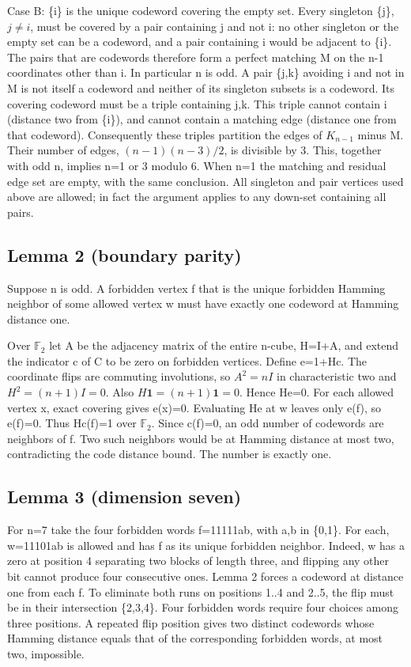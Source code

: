 \documentclass[
]{article}
\begin{document}
Case B: \{i\} is the unique codeword covering the empty set. Every
singleton \{j\}, \(j\ne i\), must be covered by a pair containing j and
not i: no other singleton or the empty set can be a codeword, and a pair
containing i would be adjacent to \{i\}. The pairs that are codewords
therefore form a perfect matching M on the n-1 coordinates other than i.
In particular n is odd. A pair \{j,k\} avoiding i and not in M is not
itself a codeword and neither of its singleton subsets is a codeword.
Its covering codeword must be a triple containing j,k. This triple
cannot contain i (distance two from \{i\}), and cannot contain a
matching edge (distance one from that codeword). Consequently these
triples partition the edges of \(K_{n-1}\) minus M. Their number of
edges, \((n-1)(n-3)/2\), is divisible by 3. This, together with odd n,
implies n=1 or 3 modulo 6. When n=1 the matching and residual edge set
are empty, with the same conclusion. All singleton and pair vertices
used above are allowed; in fact the argument applies to any down-set
containing all pairs.

\subsection{Lemma 2 (boundary parity)}\label{lemma-2-boundary-parity}

Suppose n is odd. A forbidden vertex f that is the unique forbidden
Hamming neighbor of some allowed vertex w must have exactly one codeword
at Hamming distance one.

Over \(\mathbb{F}_2\) let A be the adjacency matrix of the entire
n-cube, H=I+A, and extend the indicator c of C to be zero on forbidden
vertices. Define e=1+Hc. The coordinate flips are commuting involutions,
so \(A^2=nI\) in characteristic two and \(H^2=(n+1)I=0\). Also
\(H\mathbf{1}=(n+1)\mathbf{1}=0\). Hence He=0. For each allowed vertex
x, exact covering gives e(x)=0. Evaluating He at w leaves only e(f), so
e(f)=0. Thus Hc(f)=1 over \(\mathbb{F}_2\). Since c(f)=0, an odd number
of codewords are neighbors of f. Two such neighbors would be at Hamming
distance at most two, contradicting the code distance bound. The number
is exactly one.

\subsection{Lemma 3 (dimension seven)}\label{lemma-3-dimension-seven}

For n=7 take the four forbidden words f=11111ab, with a,b in \{0,1\}.
For each, w=11101ab is allowed and has f as its unique forbidden
neighbor. Indeed, w has a zero at position 4 separating two blocks of
length three, and flipping any other bit cannot produce four consecutive
ones. Lemma 2 forces a codeword at distance one from each f. To
eliminate both runs on positions 1..4 and 2..5, the flip must be in
their intersection \{2,3,4\}. Four forbidden words require four choices
among three positions. A repeated flip position gives two distinct
codewords whose Hamming distance equals that of the corresponding
forbidden words, at most two, impossible.
\end{document}
